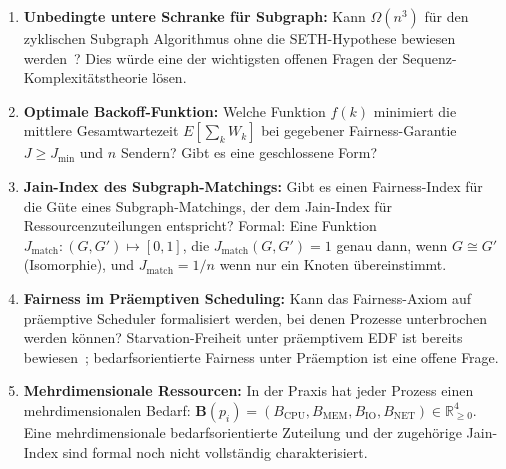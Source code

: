 ﻿\documentclass[a4paper,12pt]{article}
\theoremstyle{definition}
\begin{document}
\begin{enumerate}
  \item \textbf{Unbedingte untere Schranke für Subgraph:}
        Kann $\Omega(n^3)$ für den zyklischen
        Subgraph Algorithmus ohne die SETH-Hypothese
        bewiesen werden~\cite{abboud2015tight}?
        Dies würde eine der wichtigsten offenen Fragen
        der Sequenz-Komplexitätstheorie lösen.

  \item \textbf{Optimale Backoff-Funktion:}
        Welche Funktion $f(k)$ minimiert die mittlere
        Gesamtwartezeit $E[\sum_k W_k]$ bei gegebener
        Fairness-Garantie $J \geq J_{\min}$ und
        $n$ Sendern? Gibt es eine geschlossene Form?

  \item \textbf{Jain-Index des Subgraph-Matchings:}
        Gibt es einen Fairness-Index für die
        Güte eines Subgraph-Matchings, der dem
        Jain-Index für Ressourcenzuteilungen entspricht?
        Formal: Eine Funktion
        $J_{\mathrm{match}}: (G, G') \mapsto [0,1]$,
        die $J_{\mathrm{match}}(G, G') = 1$ genau dann,
        wenn $G \cong G'$ (Isomorphie), und
        $J_{\mathrm{match}} = 1/n$ wenn nur ein
        Knoten übereinstimmt.

  \item \textbf{Fairness im Präemptiven Scheduling:}
        Kann das Fairness-Axiom auf präemptive
        Scheduler formalisiert werden, bei denen
        Prozesse unterbrochen werden können?
        Starvation-Freiheit unter präemptivem
        EDF ist bereits bewiesen~\cite{liu1973scheduling};
        bedarfsorientierte Fairness unter Präemption
        ist eine offene Frage.

  \item \textbf{Mehrdimensionale Ressourcen:}
        In der Praxis hat jeder Prozess einen
        mehrdimensionalen Bedarf:
        $\mathbf{B}(p_i) = (B_{\mathrm{CPU}},
        B_{\mathrm{MEM}}, B_{\mathrm{IO}},
        B_{\mathrm{NET}}) \in \mathbb{R}^4_{\geq 0}$.
        Eine mehrdimensionale bedarfsorientierte
        Zuteilung und der zugehörige Jain-Index
        sind formal noch nicht vollständig
        charakterisiert.
\end{enumerate}
\end{document}
